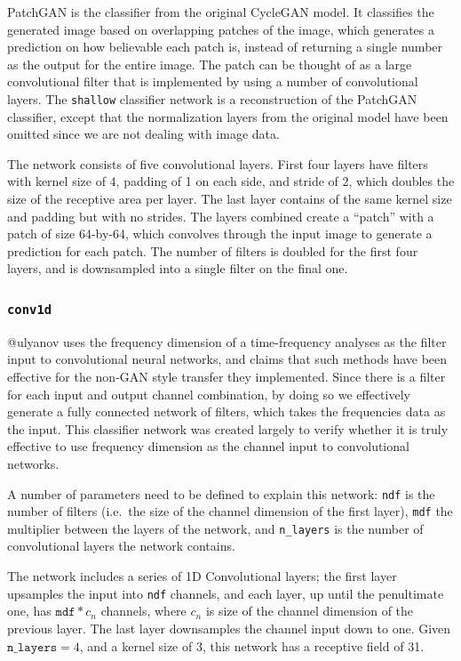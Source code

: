 \documentclass[12pt,a4paper,]{report}
\begin{document}
PatchGAN is the classifier from the original CycleGAN model. It
classifies the generated image based on overlapping patches of the
image, which generates a prediction on how believable each patch is,
instead of returning a single number as the output for the entire image.
The patch can be thought of as a large convolutional filter that is
implemented by using a number of convolutional layers. The
\texttt{shallow} classifier network is a reconstruction of the PatchGAN
classifier, except that the normalization layers from the original model
have been omitted since we are not dealing with image data.

The network consists of five convolutional layers. First four layers
have filters with kernel size of 4, padding of 1 on each side, and
stride of 2, which doubles the size of the receptive area per layer. The
last layer contains of the same kernel size and padding but with no
strides. The layers combined create a ``patch'' with a patch of size
64-by-64, which convolves through the input image to generate a
prediction for each patch. The number of filters is doubled for the
first four layers, and is downsampled into a single filter on the final
one.

\hypertarget{conv1d}{%
\subsubsection{\texorpdfstring{\texttt{conv1d}}{conv1d}}\label{conv1d}}

@ulyanov uses the frequency dimension of a time-frequency analyses as
the filter input to convolutional neural networks, and claims that such
methods have been effective for the non-GAN style transfer they
implemented. Since there is a filter for each input and output channel
combination, by doing so we effectively generate a fully connected
network of filters, which takes the frequencies data as the input. This
classifier network was created largely to verify whether it is truly
effective to use frequency dimension as the channel input to
convolutional networks.

A number of parameters need to be defined to explain this network:
\texttt{ndf} is the number of filters (i.e.~the size of the channel
dimension of the first layer), \texttt{mdf} the multiplier between the
layers of the network, and \texttt{n\_layers} is the number of
convolutional layers the network contains.

The network includes a series of 1D Convolutional layers; the first
layer upsamples the input into \texttt{ndf} channels, and each layer, up
until the penultimate one, has \(\texttt{mdf} * c_n\) channels, where
\(c_n\) is size of the channel dimension of the previous layer. The last
layer downsamples the channel input down to one. Given
\(\texttt{n\_layers} = 4\), and a kernel size of 3, this network has a
receptive field of 31.
\end{document}
